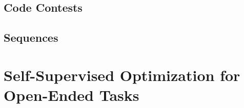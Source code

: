 \subsection{Code Contests}

\subsection{Sequences}

\section{Self-Supervised Optimization for Open-Ended Tasks}
